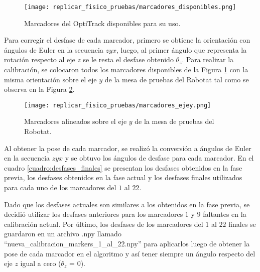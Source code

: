 \begin{figure}[H]
	\centering
	\texttt{[image: replicar\_fisico\_pruebas/marcadores\_disponibles.png]}
	\caption{Marcadores del OptiTrack disponibles para su uso.}
	\label{fig:marcadores_disponibles}
\end{figure}

Para corregir el desfase de cada marcador, primero se obtiene la orientación con ángulos de Euler en la secuencia $zyx$, luego, al primer ángulo que representa la rotación respecto al eje $z$ se le resta el desfase obtenido $\theta_z$. Para realizar la calibración, se colocaron todos los marcadores disponibles de la Figura \ref{fig:marcadores_disponibles} con la misma orientación sobre el eje $y$ de la mesa de pruebas del Robotat tal como se observa en la Figura \ref{fig:marcadores_calibracion}.

\begin{figure}[H]
	\centering
	\texttt{[image: replicar\_fisico\_pruebas/marcadores\_ejey.png]}
	\caption{Marcadores alineados sobre el eje $y$ de la mesa de pruebas del Robotat.}
	\label{fig:marcadores_calibracion}
\end{figure}

Al obtener la pose de cada marcador, se realizó la conversión a ángulos de Euler en la secuencia $zyx$ y se obtuvo los ángulos de desfase para cada marcador. En el cuadro \ref{cuadro:desfases_finales} se presentan los desfases obtenidos en la fase previa, los desfases obtenidos en la fase actual y los desfases finales utilizados para cada uno de los marcadores del $1$ al $22$. 

Dado que los desfases actuales son similares a los obtenidos en la fase previa, se decidió utilizar los desfases anteriores para los marcadores $1$ y $9$ faltantes en la calibración actual. Por último, los desfases de los marcadores del $1$ al $22$ finales se guardaron en un archivo .npy llamado ``nueva\_calibracion\_markers\_1\_al\_22.npy'' para aplicarlos luego de obtener la pose de cada marcador en el algoritmo y así tener siempre un ángulo respecto del eje $z$ igual a cero ($\theta_z$ = 0).


